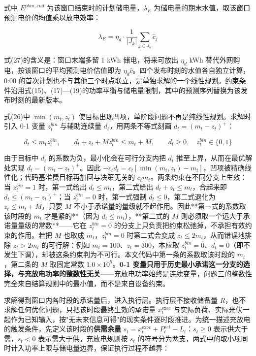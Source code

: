 \documentclass[12pt,a4paper]{ctexart}
\begin{document}
式中 $E^{plan,end}$ 为该窗口结束时的计划储电量，$\lambda_E$ 为储电量的期末水值，取该窗口预测电价的均值乘以放电效率：

\begin{equation}
\lambda_E=\eta_d\cdot\frac{1}{|J_k|}\sum_{j\in J_k}\hat{c}_j
\end{equation}

式(27)的含义是：窗口末端多留 1 kWh 储电，将来可放出 $\eta_d$ kWh 替代外网购电，按该窗口的平均预测电价估值即为 $\eta_d\hat{c}$。四个发布时刻的水值各自独立计算，0:00 的首次计划也不与其他三个时点联立，是单独求解的一个线性规划。约束条件沿用式(15)、(17)—(19)的功率平衡与储电量限制，其中的预测序列替换为该发布时刻的最新版本。

式(26)中 $\min(m_t,z_t)$ 使目标出现凹项，单阶段问题不再是纯线性规划。求解时引入 0-1 变量 $z^{bin}_t$ 与辅助连续量 $d_t$，用两条不等式刻画 $d_t=\left(m_t-z_t\right)^{+}$：

\begin{equation}
d_t\le m_t z^{bin}_t,\qquad d_t+z_t+M z^{bin}_t\le m_t+M,\qquad d_t\ge0,\quad z^{bin}_t\in\{0,1\}
\end{equation}

由于目标中 $d_t$ 的系数为负，最小化会在可行分支内把 $d_t$ 推至上界，从而在最优解处实现 $d_t=(m_t-z_t)^+$。因此 $-c_t d_t=c_t[\min(m_t,z_t)-m_t]$，凹项被精确线性化；代码基准费目标再加回与决策无关的 $c_t m_t$。两条约束在不同分支上生效：当 $z^{bin}_t=1$ 时，第一式给出 $d_t\le m_t$，第二式给出 $d_t+z_t\le m_t$，合起来即 $d_t\le(m_t-z_t)^{+}$；当 $z^{bin}_t=0$ 时，第一式强制 $d_t\le0$，第二式退化为 $z_t\le m_t+M$，只要 $M$ 不小于承诺量的量级就不起作用。因此**第一式的系数取该时段的 $m_t$ 才是紧的**（因为 $d_t\le m_t$），**第二式的 $M$ 则必须取一个远大于承诺量量级的常数**——它在 $z^{bin}_t=0$ 的分支上只负责把约束松弛掉，不承担有效约束的作用。若把 $M$ 也取成 $m_t$，$z^{bin}_t=0$ 时第二式会变成 $z_t\le 2m_t$，从而错误地排除 $z_t>2m_t$ 的可行解：例如 $m_t=100$、$z_t=300$，本应取 $z^{bin}_t=0$、$d_t=0$（即不发生下调），却被这条约束判为不可行。本文代码中第一条的系数取该时段的 $m_t$，第二条的 $M$ 取固定常数 $1.0\times10^{5}$。\textbf{0-1 变量只用于历史最小承诺这一分支的选择，与充放电功率的整数性无关}——充放电功率始终是连续变量，问题三的整数性完全来自结算规则中的最小值，而不是来自设备约束。

求解得到窗口内各时段的承诺量后，进入执行层。执行层不接收储备量 $R$，也不求解任何优化问题，只把该时段最终生效的承诺量 $x_t^{\mathrm{exec}}$ 与实际负荷、实际光伏一起作为已知输入，按"无未来信息可得"的现实条件逐时段推进。为统一描述充放电的触发条件，先定义该时段的\textbf{供需余量} $s_t=x_t^{\mathrm{exec}}+P_t^{\mathrm{act}}-L_t$：$s_t\ge0$ 表示供大于需，$s_t<0$ 表示需大于供。充放电规则按 $s_t$ 的符号分为两支，两式中的取小项同时计入功率上限与储电量边界，保证执行过程不越界：
\end{document}
